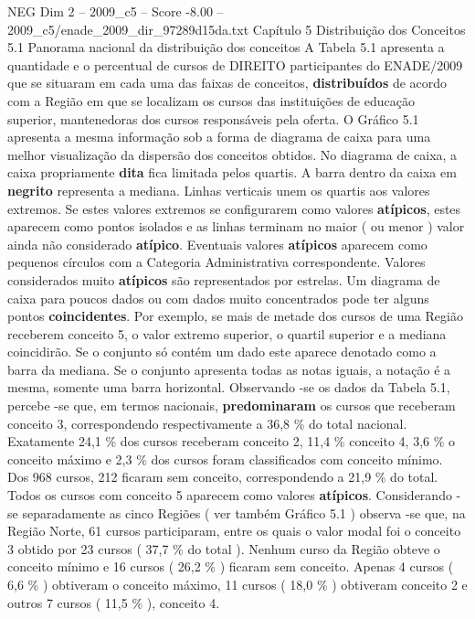 \begin{textsample}{NEG Dim 2 – 2009\_c5 – Score -8.00 – 2009\_c5/enade\_2009\_dir\_97289d15da.txt}  \label{ex:f2_neg_012}
Capítulo 5 Distribuição dos Conceitos 5.1 Panorama nacional da distribuição dos conceitos A Tabela 5.1 apresenta a quantidade e o percentual de cursos de DIREITO participantes do ENADE/2009 que se situaram em cada uma das faixas de conceitos, \textbf{distribuídos} de acordo com a Região em que se localizam os cursos das instituições de educação superior, mantenedoras dos cursos responsáveis pela oferta.
O Gráfico 5.1 apresenta a mesma informação sob a forma de diagrama de caixa para uma melhor visualização da dispersão dos conceitos obtidos.
No diagrama de caixa, a caixa propriamente \textbf{dita} fica limitada pelos quartis.
A barra dentro da caixa em \textbf{negrito} representa a mediana.
Linhas verticais unem os quartis aos valores extremos.
Se estes valores extremos se configurarem como valores \textbf{atípicos}, estes aparecem como pontos isolados e as linhas terminam no maior ( ou menor ) valor ainda não considerado \textbf{atípico}.
Eventuais valores \textbf{atípicos} aparecem como pequenos círculos com a Categoria Administrativa correspondente.
Valores considerados muito \textbf{atípicos} são representados por estrelas.
Um diagrama de caixa para poucos dados ou com dados muito concentrados pode ter alguns pontos \textbf{coincidentes}.
Por exemplo, se mais de metade dos cursos de uma Região receberem conceito 5, o valor extremo superior, o quartil superior e a mediana coincidirão.
Se o conjunto só contém um dado este aparece denotado como a barra da mediana.
Se o conjunto apresenta todas as notas iguais, a notação é a mesma, somente uma barra horizontal.
Observando -se os dados da Tabela 5.1, percebe -se que, em termos nacionais, \textbf{predominaram} os cursos que receberam conceito 3, correspondendo respectivamente a 36,8 \% do total nacional.
Exatamente 24,1 \% dos cursos receberam conceito 2, 11,4 \% conceito 4, 3,6 \% o conceito máximo e 2,3 \% dos cursos foram classificados com conceito mínimo.
Dos 968 cursos, 212 ficaram sem conceito, correspondendo a 21,9 \% do total.
Todos os cursos com conceito 5 aparecem como valores \textbf{atípicos}.
Considerando -se separadamente as cinco Regiões ( ver também Gráfico 5.1 ) observa -se que, na Região Norte, 61 cursos participaram, entre os quais o valor modal foi o conceito 3 obtido por 23 cursos ( 37,7 \% do total ).
Nenhum curso da Região obteve o conceito mínimo e 16 cursos ( 26,2 \% ) ficaram sem conceito.
Apenas 4 cursos ( 6,6 \% ) obtiveram o conceito máximo, 11 cursos ( 18,0 \% ) obtiveram conceito 2 e outros 7 cursos ( 11,5 \% ), conceito 4.

\end{textsample}
